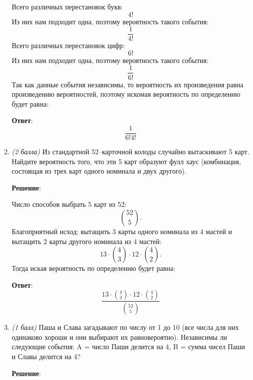 \documentclass{article}
\begin{document}
\begin{enumerate}
    Всего различных перестановок букв:
    \begin{equation}
        4!
    \end{equation}
    Из них нам подходит одна, поэтому вероятность такого события:
    \begin{equation}
        \frac{1}{4!}
    \end{equation}
    Всего различных перестановок цифр:
    \begin{equation}
        6!
    \end{equation}
    Из них нам подходит одна, поэтому вероятность такого события:
    \begin{equation}
        \frac{1}{6!}
    \end{equation}
    Так как данные события независимы, то вероятность их произведения равна произведению вероятностей, поэтому искомая вероятность по определению будет равна:

    \textbf{Ответ}:
    $$\dfrac{1}{6!4!}$$

    \item \textit{(2 балла)} Из стандартной 52–карточной колоды случайно вытаскивают 5 карт. Найдите вероятность того, что эти 5 карт образуют фулл хаус (комбинация, состоящая
    из трех карт одного номинала и двух другого).

    \textbf{Решение}:

    Число способов выбрать 5 карт из 52:
    \begin{equation}
        \binom{52}{5}.
    \end{equation}
    Благоприятный исход: вытащить 3 карты одного номинала из 4 мастей и вытащить 2 карты другого номинала из 4 мастей:
    \begin{equation}
        13 \cdot \binom{4}{3} \cdot 12 \cdot \binom{4}{2}.
    \end{equation}
    Тогда иская вероятность по определению будет равна:

    \textbf{Ответ}:
    $$\dfrac{13 \cdot \binom{4}{3} \cdot 12 \cdot \binom{4}{2}}{\binom{52}{5}}$$


    \item \textit{(1 балл)} Паша и Слава загадывают по числу от 1 до 10 (все числа для них одинаково
    хороши и они выбирают их равновероятно). Независимы ли следующие события:
    A = число Паши делится на 4,
    B = сумма чисел Паши и Славы делится на 4?

    \textbf{Решение}:


\end{enumerate}
\end{document}
